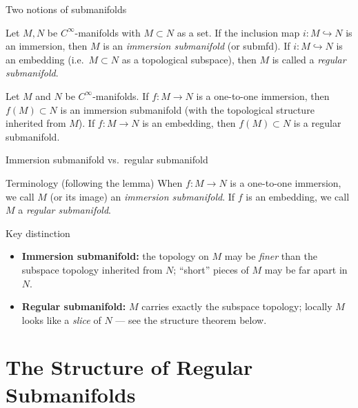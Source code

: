 \documentclass[10pt]{beamer}
\begin{document}
\begin{frame}{Two notions of submanifolds}
	\begin{definition}[Submanifolds]
		Let $M, N$ be $C^{\infty}$-manifolds with $M \subset N$ as a set.
		If the inclusion map $i : M \hookrightarrow N$ is an immersion,
		then $M$ is an \emph{immersion submanifold} (or submfd). If
		$i : M \hookrightarrow N$ is an embedding (i.e.\ $M \subset N$
		as a topological subspace), then $M$ is called a
		\emph{regular submanifold}.
	\end{definition}
	\medskip
	\begin{lemma}
		Let $M$ and $N$ be $C^{\infty}$-manifolds. If $f : M
			\longrightarrow N$ is a one-to-one immersion, then $f(M) \subset N$
		is an immersion submanifold (with the topological structure
		inherited from $M$). If $f : M \longrightarrow N$ is an embedding,
		then $f(M) \subset N$ is a regular submanifold.
	\end{lemma}
\end{frame}

\begin{frame}{Immersion submanifold vs.\ regular submanifold}
	\begin{block}{Terminology (following the lemma)}
		When $f : M \longrightarrow N$ is a one-to-one immersion, we call
		$M$ (or its image) an \emph{immersion submanifold}. If $f$ is an
		embedding, we call $M$ a \emph{regular submanifold}.
	\end{block}
	\medskip
	\begin{alertblock}{Key distinction}
		\begin{itemize}
			\item \textbf{Immersion submanifold:} the topology on $M$ may
			      be \emph{finer} than the subspace topology inherited from
			      $N$; ``short'' pieces of $M$ may be far apart in $N$.
			\item \textbf{Regular submanifold:} $M$ carries exactly the
			      subspace topology; locally $M$ looks like a
			      \emph{slice} of $N$ --- see the structure theorem below.
		\end{itemize}
	\end{alertblock}
\end{frame}

\section{The Structure of Regular Submanifolds}
\end{document}
